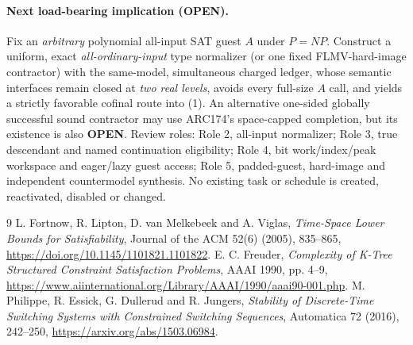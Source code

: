 \documentclass[11pt]{article}
\newcommand{\OPEN}{\textbf{OPEN}}
\begin{document}
\paragraph{Next load-bearing implication (OPEN).}
Fix an \emph{arbitrary} polynomial
all-input SAT guest $A$ under $P=NP$.
Construct a uniform, exact
\emph{all-ordinary-input} type
normalizer (or one fixed
FLMV-hard-image contractor)
with the same-model,
simultaneous charged ledger,
whose semantic interfaces remain
closed at \emph{two real levels},
avoids every full-size $A$ call,
and yields a strictly favorable
cofinal route into (1).
An alternative one-sided
globally successful sound contractor
may use ARC174's space-capped
completion, but its existence
is also \OPEN. Review roles:
Role 2, all-input normalizer;
Role 3, true descendant and
named continuation eligibility;
Role 4, bit work/index/peak
workspace and eager/lazy guest
access; Role 5, padded-guest,
hard-image and independent
countermodel synthesis. No
existing task or schedule
is created, reactivated,
disabled or changed.

\begin{thebibliography}{9}
 L. Fortnow, R. Lipton,
D. van Melkebeek and A. Viglas,
\emph{Time-Space Lower Bounds for
Satisfiability}, Journal of the ACM
52(6) (2005), 835--865,
\url{https://doi.org/10.1145/1101821.1101822}.
 E. C. Freuder,
\emph{Complexity of K-Tree
Structured Constraint Satisfaction
Problems}, AAAI 1990, pp. 4--9,
\url{https://www.aiinternational.org/Library/AAAI/1990/aaai90-001.php}.
 M. Philippe,
R. Essick, G. Dullerud and R. Jungers,
\emph{Stability of Discrete-Time
Switching Systems with Constrained
Switching Sequences}, Automatica
72 (2016), 242--250,
\url{https://arxiv.org/abs/1503.06984}.
\end{thebibliography}
\end{document}
